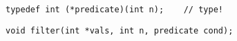 \begin{frame}[fragile]{}
  \begin{lstlisting}[style = Cstyle]
  typedef int (*predicate)(int n);    // type!
  \end{lstlisting}

  \pause

  \begin{lstlisting}[style = Cstyle]
  void filter(int *vals, int n, predicate cond);
  \end{lstlisting}

  \pause
  \vspace{0.30cm}
  \centerline{\large {}}

\end{frame}
